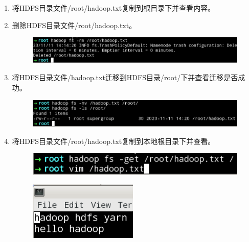 \documentclass {article}
\begin{document}
\begin{enumerate}
					\item 将HDFS目录文件/root/hadoop.txt复制到根目录下并查看内容。
					\item 删除HDFS目录文件/root/hadoop.txt。
					\begin{figure}[H]
						\centering
						\includegraphics[width=4.5in]{figures/fig5.jpg}
					\end{figure}
				
					\item 将HDFS目录文件/hadoop.txt迁移到HDFS目录/root/下并查看迁移是否成功。
					\begin{figure}[H]
						\centering
						\includegraphics[width=4.5in]{figures/fig6.png}
					\end{figure}
				
					\item 将HDFS目录文件/root/hadoop.txt复制到本地根目录下并查看。
					\begin{figure}[H]
						\centering
						\includegraphics{figures/fig7.png}
					\end{figure}
					\begin{figure}[H]
						\centering
						\includegraphics{figures/fig8.png}
					\end{figure}
				\end{enumerate}
			
\end{document}
